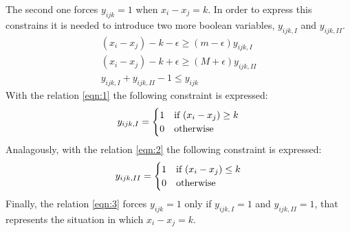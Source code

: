 The second one forces $ y_{ijk} = 1 $ when $ x_{i} - x_{j} = k $.
In order to express this constrains it is needed to introduce two more boolean variables, $ y_{ijk, I} $ and $ y_{ijk, II} $.
\begin{gather}
\label{eqn:1}
(x_{i} - x_{j}) - k - \epsilon \ge (m - \epsilon) y_{ijk, I} \\
\label{eqn:2}
(x_{i} - x_{j}) - k + \epsilon \ge (M + \epsilon) y_{ijk, II} \\
\label{eqn:3}
y_{ijk, I} + y_{ijk, II} - 1 \le y_{ijk}
\end{gather}
With the relation \ref{eqn:1} the following constraint is expressed:
\[
y_{ijk, I} = 
\begin{cases}
1	&	\text{if $ (x_{i} - x_{j}) \ge k $}	\\
0	&	\text{otherwise}
\end{cases}
\]
Analagously, with the relation \ref{eqn:2} the following constraint is expressed:
\[
y_{ijk, II} = 
\begin{cases}
1	&	\text{if $ (x_{i} - x_{j}) \le k $}	\\
0	&	\text{otherwise}
\end{cases}
\]
Finally, the relation \ref{eqn:3} forces $ y_{ijk} = 1 $ only if $ y_{ijk, I} = 1 $ and $ y_{ijk, II} = 1 $, that represents the situation in which $ x_{i} - x_{j} = k $.